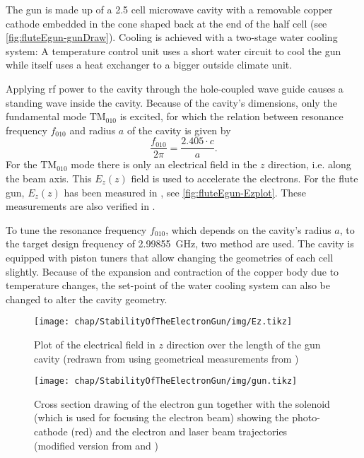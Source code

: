 The gun is made up of a 2.5 cell microwave cavity with a removable copper cathode embedded in the cone shaped back at the end of the half cell (see \autoref{fig:fluteEgun-gunDraw}). Cooling is achieved with a two-stage water cooling system: A temperature control unit uses a short water circuit to cool the gun while itself uses a heat exchanger to a bigger outside climate unit.

Applying \gls{rf} power to the cavity through the hole-coupled wave guide causes a standing wave inside the cavity. Because of the cavity's dimensions, only the fundamental mode $\text{TM}_{010}$ is excited, for which the relation between resonance frequency $f_{010}$ and radius $a$ of the cavity is given by
\begin{equation}
\frac{f_{010}}{2\pi}=\frac{2.405 \cdot c}{a}.
\end{equation}
For the $\text{TM}_{010}$ mode there is only an electrical field in the $z$ direction, i.e. along the beam axis. This $E_z(z)$ field is used to accelerate the electrons. For the \gls{flute} gun, $E_z(z)$ has been measured in \cite{Bossart:clic}, see \autoref{fig:fluteEgun-Ezplot}. These measurements are also verified in \cite{Schuh2014}.

To tune the resonance frequency $f_{010}$, which depends on the cavity's radius $a$, to the target design frequency of \SI{2.99855}{\GHz}, two method are used. The cavity is equipped with piston tuners that allow changing the geometries of each cell slightly. Because of the expansion and contraction of the copper body due to temperature changes, the set-point of the water cooling system can also be changed to alter the cavity geometry.

\begin{figure}[tbh]
	\centering
	\texttt{[image: chap/StabilityOfTheElectronGun/img/Ez.tikz]}
	\caption[Plot of the electric field $E_z(z)$ in the electron gun]{Plot of the electrical field in $z$ direction over the length of the gun cavity (redrawn from \cite{Bossart:clic} using geometrical measurements from \cite{Hoeninger2014})}
	\label{fig:fluteEgun-Ezplot}
\end{figure}

\begin{figure}[tbh]
	\centering
	\texttt{[image: chap/StabilityOfTheElectronGun/img/gun.tikz]}
	\caption[Cross-section of the electron gun]{Cross section drawing of the electron gun together with the solenoid (which is used for focusing the electron beam) showing the photo-cathode (red) and the electron and laser beam trajectories
	\\(modified version from \cite{Bossart:clic} and \cite{Bossart:288412})}
	\label{fig:fluteEgun-gunDraw}
\end{figure}



